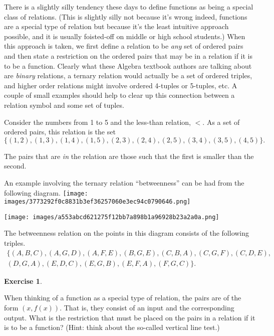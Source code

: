 \documentclass[10pt,]{book}
\theoremstyle{plain}
\theoremstyle{definition}
\theoremstyle{definition}
\newtheorem{exercise}[theorem]{Exercise}
\numberwithin{equation}{section}
\newcommand{\lt}{ < }
\begin{document}
    There is a slightly silly tendency these days to define functions as being
    a special class of relations. (This is slightly silly not because it's wrong \textemdash{} indeed, functions are a special type of relation \textemdash{} but because it's the
    least intuitive approach possible, and it is usually foisted-off on middle or
    high school students.) When this approach is taken, we first define
    a relation to be \emph{any} set of ordered pairs and then state a
    restriction on the ordered pairs that may be in a relation if it
    is to be a function. Clearly what these Algebra textbook authors
    are talking about are \emph{binary} relations, a ternary relation
    would actually be a set of ordered triples, and higher order relations
    might involve ordered 4-tuples or 5-tuples, etc. A couple of small examples
    should help to clear up this connection between a relation symbol and
    some set of tuples.
\par

    Consider the numbers from 1 to 5 and the less-than relation, \(\lt\).
    As a set of ordered pairs, this relation is the set
    \begin{equation*}
      \{(1,2), (1,3), (1,4), (1,5), (2,3), (2,4), (2,5), (3,4), (3,5), (4,5) \}.
    \end{equation*}
\par

    The pairs that are \emph{in} the relation are those such that the first is smaller than the second.
\par

    An example involving the ternary relation ``betweenness'' can be had
    from the following diagram.
\texttt{[image: images/3773292f0c8831b3ef36257060e3ec94c0790646.png]}
\par

    \ifx\SetFigFont\undefined\gdef\SetFigFont#1#2#3#4#5{
    \reset@font\fontsize{#1}{#2pt}
    \fontfamily{#3}\fontseries{#4}\fontshape{#5}
    \selectfont}\fi
\texttt{[image: images/a553abcd621275f12bb7a898b1a96928b23a2a0a.png]}
\par

    The betweenness relation on the points in this diagram consists of the
    following triples.
    \begin{gather*}
\{ (A,B,C), (A,G,D), (A,F,E), (B,G,E), (C,B,A), (C,G,F), (C,D,E),\\
(D,G,A), (E,D,C), (E,G,B), (E,F,A), (F,G,C) \}.
\end{gather*}
\begin{exercise}\label{exercise-6}

        When thinking of a function as a special type of relation, the pairs are of
        the form \((x, f(x))\). That is, they consist of an input and the corresponding
        output. What is the restriction that must be placed on the pairs in a
        relation if it is to be a function? (Hint: think about the so-called
        vertical line test.)
\end{exercise}
\typeout{************************************************}
\typeout{************************************************}
\end{document}
